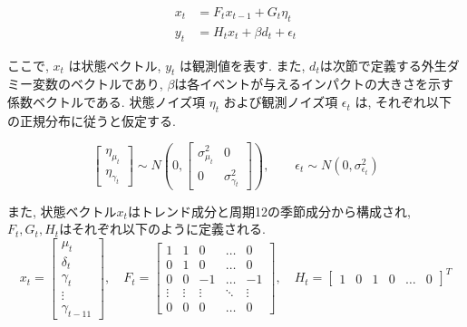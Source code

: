 \documentclass[a4paper, 10pt]{jarticle}
\begin{document}
\begin{align}
    x_t &= F_t x_{t-1} + G_t \eta_{t} \label{eq:system_model} \\
    y_t &= H_t x_t + \beta d_t + \epsilon_t \label{eq:observation_model}
\end{align}

ここで, $x_{t}$ は状態ベクトル, $y_{t}$ は観測値を表す. 
また, $d_t$は次節で定義する外生ダミー変数のベクトルであり, $\beta$は各イベントが与えるインパクトの大きさを示す係数ベクトルである. 
状態ノイズ項 $\eta_t$ および観測ノイズ項 $\epsilon_t$ は, それぞれ以下の正規分布に従うと仮定する. 

\begin{equation}
    \begin{bmatrix}
        \eta_{\mu_{t}}  \\
        \eta_{\gamma_{t}}
    \end{bmatrix}
    \sim N \left( 0, 
    \begin{bmatrix}
        \sigma_{\mu_{t}}^2 & 0  \\
        0 & \sigma_{\gamma_{t}}^2
    \end{bmatrix} \right)
    ,
    \qquad %
    \epsilon_t \sim N( 0, \sigma_{\epsilon_{t}}^2)
    \label{eq:dist_combined} %
\end{equation}

また, 状態ベクトル$x_t$はトレンド成分と周期12の季節成分から構成され, $F_t, G_t, H_t$はそれぞれ以下のように定義される.
\begin{equation}
    x_t = 
    \begin{bmatrix}
        \mu_t \\
        \delta_t \\
        \gamma_t \\
        \vdots \\
        \gamma_{t-11}
    \end{bmatrix}
    , \quad
    F_t = 
    \begin{bmatrix}
        1 & 1 & 0 & \dots & 0 \\
        0 & 1 & 0 & \dots & 0 \\
        0 & 0 & -1 & \dots & -1 \\
        \vdots & \vdots & \vdots & \ddots & \vdots \\
        0 & 0 & 0 & \dots & 0
    \end{bmatrix}
    , \quad
    H_t = 
    \begin{bmatrix}
        1 & 0 & 1 & 0 & \dots & 0
    \end{bmatrix}^T
\end{equation}
\end{document}
